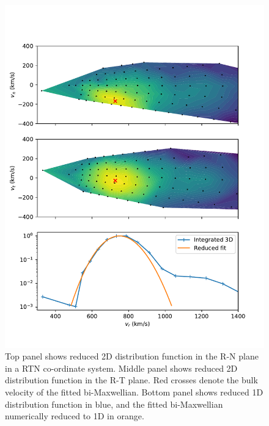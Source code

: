 \documentclass[11pt,a4paper]{article}
\begin{document}
\begin{figure}[h]
	\centering
	\includegraphics[width=1\textwidth]{3D_example}
	\caption{Top panel shows reduced 2D distribution function in the R-N plane in a RTN co-ordinate system. Middle panel shows reduced 2D distribution function in the R-T plane. Red crosses denote the bulk velocity of the fitted bi-Maxwellian. Bottom panel shows reduced 1D distribution function in blue, and the fitted bi-Maxwellian numerically reduced to 1D in orange.}
	\label{fig:3D}
\end{figure}
\end{document}
